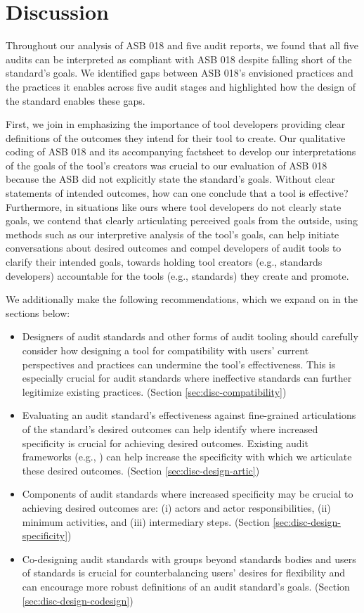 \section{Discussion}
\label{sec:disc}
Throughout our analysis of ASB 018 and five audit reports, we found that all five audits can be interpreted as compliant with ASB 018 despite falling short of the standard’s goals. We identified gaps between ASB 018’s envisioned practices and the practices it enables across five audit stages and highlighted how the design of the standard enables these gaps. 


First, we join \citet{berman2024scoping} in emphasizing the importance of tool developers providing clear definitions of the outcomes they intend for their tool to create. Our qualitative coding of ASB 018 and its accompanying factsheet to develop our interpretations of the goals of the tool’s creators was crucial to our evaluation of ASB 018 because the ASB did not explicitly state the standard’s goals. Without clear statements of intended outcomes, how can one conclude that a tool is effective? Furthermore, in situations like ours where tool developers do not clearly state goals, we contend that clearly articulating perceived goals from the outside, using methods such as our interpretive analysis of the tool’s goals, can help initiate conversations about desired outcomes and compel developers of audit tools to clarify their intended goals, towards holding tool creators (e.g., standards developers) accountable for the tools (e.g., standards) they create and promote. 

We additionally make the following recommendations, which we expand on in the sections below:
\begin{itemize}
    \item Designers of audit standards and other forms of audit tooling should carefully consider how designing a tool for compatibility with users' current perspectives and practices can undermine the tool's effectiveness. This is especially crucial for audit standards where ineffective standards can further legitimize existing practices. (Section \ref{sec:disc-compatibility})
    \item Evaluating an audit standard's effectiveness against fine-grained articulations of the standard's desired outcomes can help identify where increased specificity is crucial for achieving desired outcomes. Existing audit frameworks (e.g., \cite{ojewale2025towards, raji2020closing}) can help increase the specificity with which we articulate these desired outcomes. (Section \ref{sec:disc-design-artic})
    \item Components of audit standards where increased specificity may be crucial to achieving desired outcomes are: (i) actors and actor responsibilities, (ii) minimum activities, and (iii) intermediary steps. (Section \ref{sec:disc-design-specificity})
    \item Co-designing audit standards with groups beyond standards bodies and users of standards is crucial for counterbalancing users' desires for flexibility and can encourage more robust definitions of an audit standard's goals. (Section \ref{sec:disc-design-codesign})
\end{itemize} 


